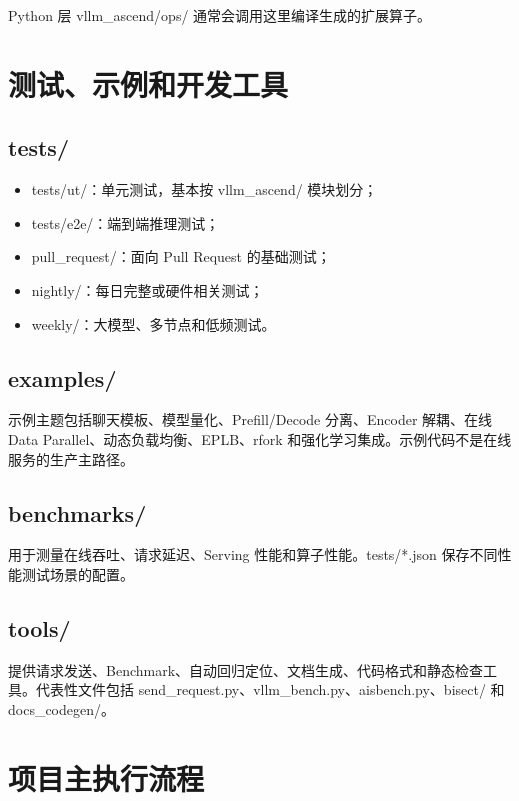 \documentclass[UTF8,11pt,a4paper]{ctexart}
\DeclareRobustCommand{\folder}[1]{\texttt{\detokenize{#1}}}
\def\folder#1{#1}%
\begin{document}
Python 层 \folder{vllm_ascend/ops/} 通常会调用这里编译生成的扩展算子。

\section{测试、示例和开发工具}

\subsection{\folder{tests/}}

\begin{itemize}
  \item \folder{tests/ut/}：单元测试，基本按 \folder{vllm_ascend/} 模块划分；
  \item \folder{tests/e2e/}：端到端推理测试；
  \item \folder{pull_request/}：面向 Pull Request 的基础测试；
  \item \folder{nightly/}：每日完整或硬件相关测试；
  \item \folder{weekly/}：大模型、多节点和低频测试。
\end{itemize}

\subsection{\folder{examples/}}

示例主题包括聊天模板、模型量化、Prefill/Decode 分离、Encoder 解耦、在线 Data Parallel、动态负载均衡、EPLB、rfork 和强化学习集成。示例代码不是在线服务的生产主路径。

\subsection{\folder{benchmarks/}}

用于测量在线吞吐、请求延迟、Serving 性能和算子性能。\folder{tests/*.json} 保存不同性能测试场景的配置。

\subsection{\folder{tools/}}

提供请求发送、Benchmark、自动回归定位、文档生成、代码格式和静态检查工具。代表性文件包括 \folder{send_request.py}、\folder{vllm_bench.py}、\folder{aisbench.py}、\folder{bisect/} 和 \folder{docs_codegen/}。

\section{项目主执行流程}
\end{document}
